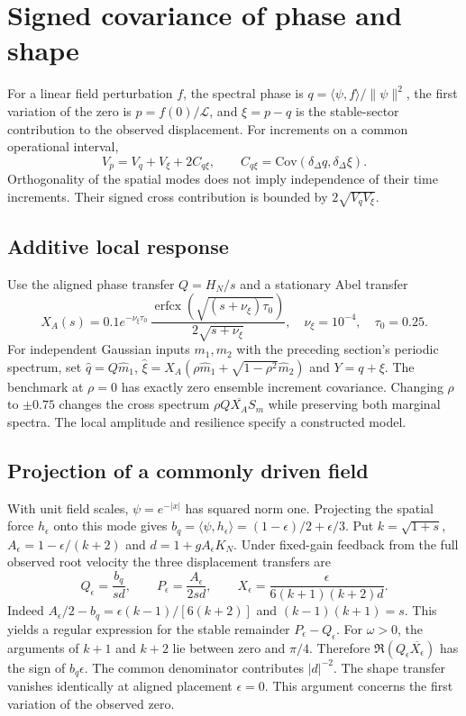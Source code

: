\documentclass[11pt]{article}
\newcommand{\Liq}{\mathcal L}
\begin{document}
\section{Signed covariance of phase and shape}
\label{sec:phase-shape}
For a linear field perturbation \(f\), the spectral phase is
\(q=\langle\psi,f\rangle/\|\psi\|^2\), the first variation of the zero is
\(p=f(0)/\Liq\), and \(\xi=p-q\) is the stable-sector contribution to the
observed displacement. For increments on a common operational interval,
\begin{equation}
 V_p=V_q+V_\xi+2C_{q\xi},\qquad C_{q\xi}=\mathrm{Cov}(\delta_\Delta q,\delta_\Delta\xi).
 \label{eq:shape-accounting}
\end{equation}
Orthogonality of the spatial modes does not imply independence of their time
increments. Their signed cross contribution is bounded by \(2\sqrt{V_qV_\xi}\).

\subsection{Additive local response}
Use the aligned phase transfer \(Q=H_N/s\) and a stationary Abel transfer
\[
 X_A(s)=0.1 e^{-\nu_\xi\tau_0}\,
 \frac{\operatorname{erfcx}(\sqrt{(s+\nu_\xi)\tau_0})}{2\sqrt{s+\nu_\xi}},
 \quad \nu_\xi=10^{-4},\quad\tau_0=0.25 .
\]
For independent Gaussian inputs \(m_1,m_2\) with the preceding section's
periodic spectrum, set \(\widehat q=Q\widehat m_1\),
\(\widehat\xi=X_A(\rho\widehat m_1+\sqrt{1-\rho^2}\widehat m_2)\)
and \(Y=q+\xi\). The benchmark at \(\rho=0\) has exactly zero ensemble
increment covariance. Changing \(\rho\) to \(\pm0.75\) changes the cross
spectrum \(\rho Q\overline{X_A}S_m\) while preserving both marginal spectra.
The local amplitude and resilience specify a constructed model.

\subsection{Projection of a commonly driven field}
With unit field scales, \(\psi=e^{-|x|}\) has squared norm one. Projecting
the spatial force \(h_\epsilon\) onto this mode gives
\(b_q=\langle\psi,h_\epsilon\rangle=(1-\epsilon)/2+\epsilon/3\).
Put \(k=\sqrt{1+s}\), \(A_\epsilon=1-\epsilon/(k+2)\) and
\(d=1+gA_\epsilon K_N\). Under fixed-gain feedback from the full observed
root velocity the three displacement transfers are
\begin{equation}
 Q_\epsilon=\frac{b_q}{s d},\qquad
 P_\epsilon=\frac{A_\epsilon}{2s d},\qquad
 X_\epsilon=\frac{\epsilon}{6(k+1)(k+2)d}.
 \label{eq:shape-transfer}
\end{equation}
Indeed \(A_\epsilon/2-b_q=\epsilon(k-1)/[6(k+2)]\) and
\((k-1)(k+1)=s\). This yields a regular expression for the stable
remainder \(P_\epsilon-Q_\epsilon\). For \(\omega>0\), the arguments
of \(k+1\) and \(k+2\) lie between zero and \(\pi/4\). Therefore
\(\Re(Q_\epsilon\overline{X_\epsilon})\) has the sign of \(b_q\epsilon\).
The common denominator contributes \(|d|^{-2}\). The shape transfer vanishes identically at aligned placement \(\epsilon=0\). This argument
concerns the first variation of the observed zero.
\end{document}
